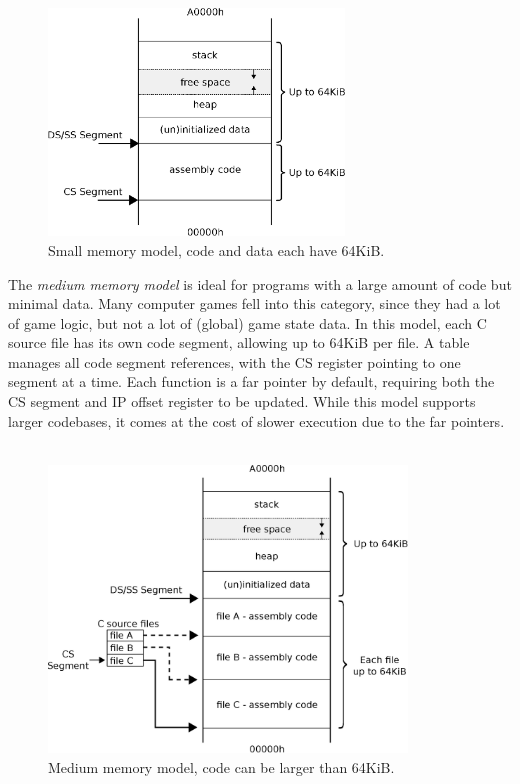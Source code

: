 \documentclass[book.tex]{subfiles}
\begin{document}
\begin{figure}[H]
\centering
\includegraphics[width=0.7\textwidth]{imgs/drawings/memory/small_mm.eps}
\caption{Small memory model, code and data each have 64KiB.}
\label{fig:mm_small}
\end{figure}

\par
The \textit{medium memory model} is ideal for programs with a large amount of code but minimal data. Many computer games fell into this category, since they had a lot of game logic, but not a lot of (global) game state data. In this model, each C source file has its own code segment, allowing up to 64KiB per file. A table manages all code segment references, with the CS register pointing to one segment at a time. Each function is a far pointer by default, requiring both the CS segment and IP offset register to be updated. While this model supports larger codebases, it comes at the cost of slower execution due to the far pointers.\\

\\

\begin{figure}[H]
\centering
\includegraphics[width=0.85\textwidth]{imgs/drawings/memory/medium_mm.eps}
\caption{Medium memory model, code can be larger than 64KiB.}
\label{fig:mm_medium}
\end{figure}
\end{document}
